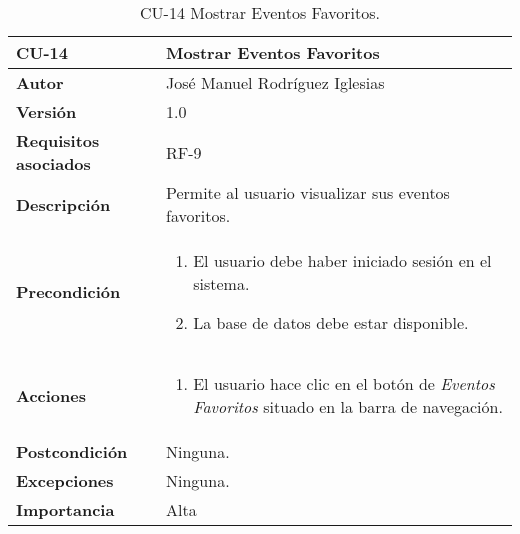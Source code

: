\begin{table}[h]
	\centering
	\begin{tabularx}{\linewidth}{ p{} p{} }
		\toprule
		\textbf{CU-14}    & \textbf{Mostrar Eventos Favoritos}\\
		\toprule
            \textbf{Autor}                & José Manuel Rodríguez Iglesias \\
		\textbf{Versión}              & 1.0    \\
	\textbf{Requisitos asociados} & RF-9\\
		\textbf{Descripción}          & Permite al usuario visualizar sus eventos favoritos. \\
		\textbf{Precondición}         &  
            \begin{enumerate}
			\def\labelenumi{\arabic{enumi}.}
			\tightlist
			\item El usuario debe haber iniciado sesión en el sistema.
			\item La base de datos debe estar disponible.
		\end{enumerate}\\
  
		\textbf{Acciones}             &
		\begin{enumerate}
			\def\labelenumi{\arabic{enumi}.}
			\tightlist
			\item El usuario hace clic en el botón de\textit{ Eventos Favoritos} situado en la barra de navegación.
		\end{enumerate}\\
		\textbf{Postcondición}        & Ninguna. \\
		\textbf{Excepciones}          & Ninguna.\\
		\textbf{Importancia}          & Alta\\
		\bottomrule
	\end{tabularx}
	\caption{CU-14 Mostrar Eventos Favoritos.}
\end{table}

